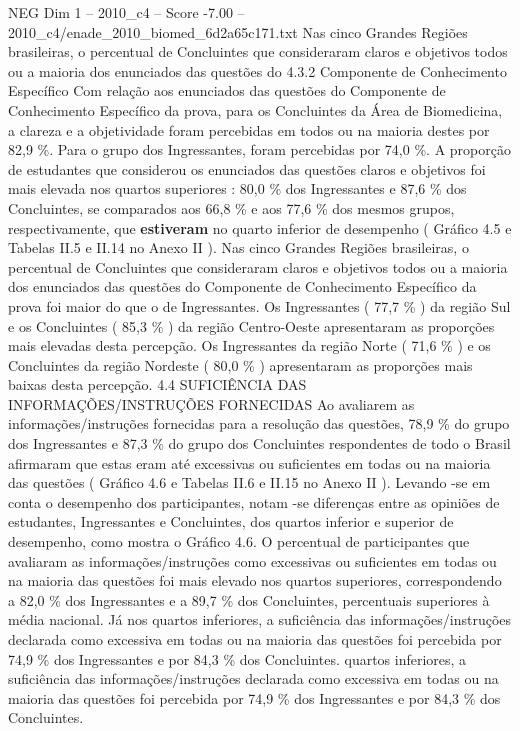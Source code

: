 \begin{textsample}{NEG Dim 1 – 2010\_c4 – Score -7.00 – 2010\_c4/enade\_2010\_biomed\_6d2a65c171.txt}
Nas cinco Grandes Regiões brasileiras, o percentual de Concluintes que consideraram claros e objetivos todos ou a maioria dos enunciados das questões do 4.3.2 Componente de Conhecimento Específico Com relação aos enunciados das questões do Componente de Conhecimento Específico da prova, para os Concluintes da Área de Biomedicina, a clareza e a objetividade foram percebidas em todos ou na maioria destes por 82,9 \%.
Para o grupo dos Ingressantes, foram percebidas por 74,0 \%.
A proporção de estudantes que considerou os enunciados das questões claros e objetivos foi mais elevada nos quartos superiores : 80,0 \% dos Ingressantes e 87,6 \% dos Concluintes, se comparados aos 66,8 \% e aos 77,6 \% dos mesmos grupos, respectivamente, que \textbf{estiveram} no quarto inferior de desempenho ( Gráfico 4.5 e Tabelas II.5 e II.14 no Anexo II ).
Nas cinco Grandes Regiões brasileiras, o percentual de Concluintes que consideraram claros e objetivos todos ou a maioria dos enunciados das questões do Componente de Conhecimento Específico da prova foi maior do que o de Ingressantes.
Os Ingressantes ( 77,7 \% ) da região Sul e os Concluintes ( 85,3 \% ) da região Centro-Oeste apresentaram as proporções mais elevadas desta percepção.
Os Ingressantes da região Norte ( 71,6 \% ) e os Concluintes da região Nordeste ( 80,0 \% ) apresentaram as proporções mais baixas desta percepção. 4.4 SUFICIÊNCIA DAS INFORMAÇÕES/INSTRUÇÕES FORNECIDAS Ao avaliarem as informações/instruções fornecidas para a resolução das questões, 78,9 \% do grupo dos Ingressantes e 87,3 \% do grupo dos Concluintes respondentes de todo o Brasil afirmaram que estas eram até excessivas ou suficientes em todas ou na maioria das questões ( Gráfico 4.6 e Tabelas II.6 e II.15 no Anexo II ).
Levando -se em conta o desempenho dos participantes, notam -se diferenças entre as opiniões de estudantes, Ingressantes e Concluintes, dos quartos inferior e superior de desempenho, como mostra o Gráfico 4.6.
O percentual de participantes que avaliaram as informações/instruções como excessivas ou suficientes em todas ou na maioria das questões foi mais elevado nos quartos superiores, correspondendo a 82,0 \% dos Ingressantes e a 89,7 \% dos Concluintes, percentuais superiores à média nacional.
Já nos quartos inferiores, a suficiência das informações/instruções declarada como excessiva em todas ou na maioria das questões foi percebida por 74,9 \% dos Ingressantes e por 84,3 \% dos Concluintes. quartos inferiores, a suficiência das informações/instruções declarada como excessiva em todas ou na maioria das questões foi percebida por 74,9 \% dos Ingressantes e por 84,3 \% dos Concluintes.

\end{textsample}

